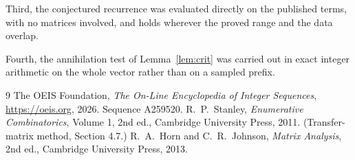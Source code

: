 \documentclass[11pt,a4paper]{article}
\theoremstyle{plain}
\theoremstyle{definition}
\begin{document}
Third, the conjectured recurrence was evaluated directly on the published terms, with no
matrices involved, and holds wherever the proved range and the data overlap.

Fourth, the annihilation test of Lemma~\ref{lem:crit} was carried out in exact integer
arithmetic on the whole vector rather than on a sampled prefix.

\begin{thebibliography}{9}
 The OEIS Foundation, \emph{The On-Line Encyclopedia of Integer
Sequences}, \url{https://oeis.org}, 2026. Sequence A259520.
 R.~P.~Stanley, \emph{Enumerative Combinatorics}, Volume 1, 2nd ed.,
Cambridge University Press, 2011. (Transfer-matrix method, Section 4.7.)
 R.~A.~Horn and C.~R.~Johnson, \emph{Matrix Analysis}, 2nd ed., Cambridge
University Press, 2013.
\end{thebibliography}
\end{document}
